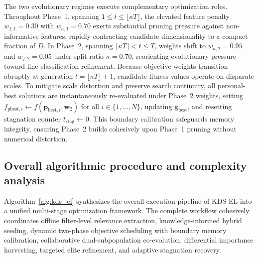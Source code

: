 The two evolutionary regimes execute complementary optimization roles. Throughout Phase~1, spanning $1 \le t \le \lfloor \kappa T \rfloor$, the elevated feature penalty $w_{f,1} = 0.30$ with $w_{a,1} = 0.70$ exerts substantial pruning pressure against non-informative features, rapidly contracting candidate dimensionality to a compact fraction of $D$. In Phase~2, spanning $\lfloor \kappa T \rfloor < t \le T$, weights shift to $w_{a,2} = 0.95$ and $w_{f,2} = 0.05$ under split ratio $\kappa = 0.70$, reorienting evolutionary pressure toward fine classification refinement. Because objective weights transition abruptly at generation $t = \lfloor \kappa T \rfloor + 1$, candidate fitness values operate on disparate scales. To mitigate scale distortion and preserve search continuity, all personal-best solutions are instantaneously re-evaluated under Phase~2 weights, setting $f_{\mathrm{pbest},i} \leftarrow f(\mathbf{p}_{\mathrm{best},i}, \mathbf{w}_2)$ for all $i \in \{1, \dots, N\}$, updating $\mathbf{g}_{\mathrm{best}}$, and resetting stagnation counter $t_{\mathrm{stag}} \leftarrow 0$. This boundary calibration safeguards memory integrity, ensuring Phase~2 builds cohesively upon Phase~1 pruning without numerical distortion.

\subsection{Overall algorithmic procedure and complexity analysis}\label{sec:main_algo}\label{sec:complexity}

Algorithm~\ref{alg:kds_el} synthesizes the overall execution pipeline of KDS-EL into a unified multi-stage optimization framework. The complete workflow cohesively coordinates offline filter-level relevance extraction, knowledge-informed hybrid seeding, dynamic two-phase objective scheduling with boundary memory calibration, collaborative dual-subpopulation co-evolution, differential importance harvesting, targeted elite refinement, and adaptive stagnation recovery.


